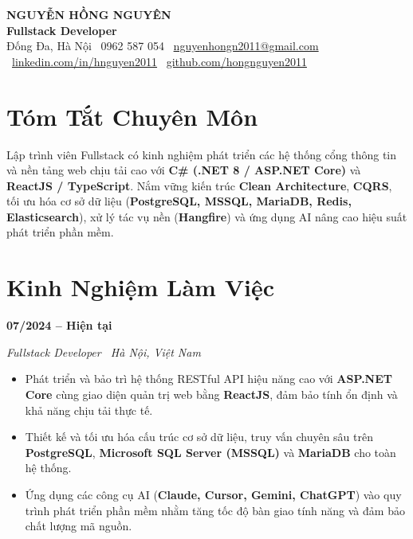 \documentclass[a4paper,9.5pt]{article}
\newcommand{\entryheading}[2]{%
  \noindent{\color{primary}\textbf{#1}}\hfill\textbf{#2}\par\nopagebreak\vspace{0.5pt}%
}
\begin{document}
\ifPDFTeX
\fi
\fontsize{9.4pt}{11.2pt}\selectfont
\color{textdark}

\begin{center}
    {\LARGE\bfseries\color{primary} NGUYỄN HỒNG NGUYÊN}\\[1pt]
    {\large\bfseries Fullstack Developer}\\[2pt]
    \small
    Đống Đa, Hà Nội \textbar\ 0962 587 054 \textbar\ \href{mailto:nguyenhongn2011@gmail.com}{nguyenhongn2011@gmail.com} \textbar\ \href{https://www.linkedin.com/in/hnguyen2011/}{linkedin.com/in/hnguyen2011} \textbar\ \href{https://github.com/hongnguyen2011}{github.com/hongnguyen2011}
\end{center}

\vspace{-6pt}

\section{Tóm Tắt Chuyên Môn}
Lập trình viên Fullstack có kinh nghiệm phát triển các hệ thống cổng thông tin và nền tảng web chịu tải cao với \textbf{C\# (.NET 8 / ASP.NET Core)} và \textbf{ReactJS / TypeScript}. Nắm vững kiến trúc \textbf{Clean Architecture}, \textbf{CQRS}, tối ưu hóa cơ sở dữ liệu (\textbf{PostgreSQL, MSSQL, MariaDB, Redis, Elasticsearch}), xử lý tác vụ nền (\textbf{Hangfire}) và ứng dụng AI nâng cao hiệu suất phát triển phần mềm.

\section{Kinh Nghiệm Làm Việc}

\entryheading{Công ty Cổ phần Tin học Tân Dân}{07/2024 -- Hiện tại}
\noindent\textit{Fullstack Developer \textbar\ Hà Nội, Việt Nam}\par\nopagebreak
\begin{itemize}
    \item Phát triển và bảo trì hệ thống RESTful API hiệu năng cao với \textbf{ASP.NET Core} cùng giao diện quản trị web bằng \textbf{ReactJS}, đảm bảo tính ổn định và khả năng chịu tải thực tế.
    \item Thiết kế và tối ưu hóa cấu trúc cơ sở dữ liệu, truy vấn chuyên sâu trên \textbf{PostgreSQL}, \textbf{Microsoft SQL Server (MSSQL)} và \textbf{MariaDB} cho toàn hệ thống.
    \item Ứng dụng các công cụ AI (\textbf{Claude, Cursor, Gemini, ChatGPT}) vào quy trình phát triển phần mềm nhằm tăng tốc độ bàn giao tính năng và đảm bảo chất lượng mã nguồn.
\end{itemize}
\end{document}
